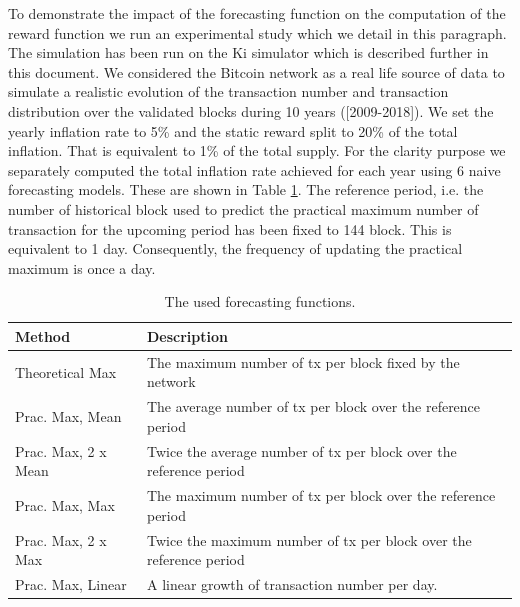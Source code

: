 To demonstrate the impact of the forecasting function on the computation of the reward function we run an experimental study which we detail in this paragraph. The simulation has been run on the Ki simulator which is described further in this document. We considered the Bitcoin network as a real life source of data to simulate a realistic evolution of the transaction number and transaction distribution over the validated blocks during 10 years ([2009-2018]). We set the yearly inflation rate to 5\% and the static reward split to 20\% of the total inflation. That is equivalent to 1\% of the total supply. For the clarity purpose  we separately computed the total inflation rate achieved for each year using 6 naive forecasting models. These are shown in Table \ref{tab:forecast}. The reference period, i.e. the number of historical block used to predict the practical maximum number of transaction for the upcoming period has been fixed to 144 block. This is equivalent to 1 day. Consequently, the frequency of updating the practical maximum is once a day.

\begin{table}
	\footnotesize
	\begin{tabular}{|l | l|} 
		\hline
		Method & Description \\ [0.5ex] 
		\hline\hline
		Theoretical Max & The maximum number of tx per block fixed by the network\\ 
		\hline
		Prac. Max, Mean & The average number of tx per block over the reference period  \\
		\hline
		Prac. Max, 2 x Mean & Twice the average number of tx per block over the reference period \\
		\hline
		Prac. Max, Max & The maximum number of tx per block over the reference period \\
		\hline
		Prac. Max, 2 x Max & Twice the maximum number of tx per block over the reference period \\
		\hline
		Prac. Max, Linear & A linear growth of transaction number per day. \\ 
		\hline
	\end{tabular}
		\caption{The used forecasting functions.}
\label{tab:forecast}
\end{table}

